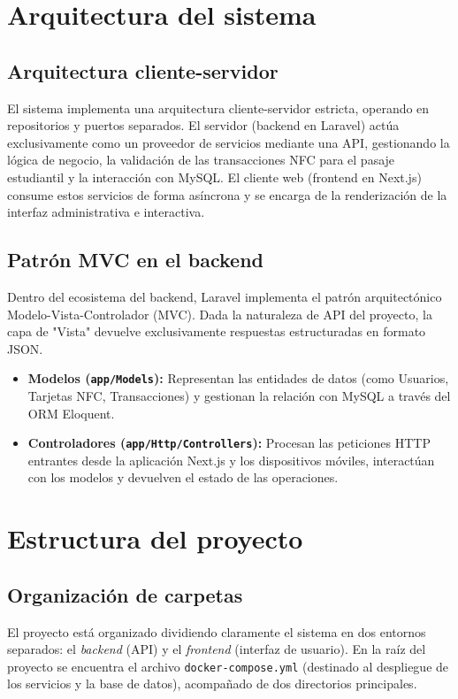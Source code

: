 \documentclass[12pt,letterpaper]{report}
\begin{document}
	\section{Arquitectura del sistema} 
	
	\subsection{Arquitectura cliente-servidor} 
	El sistema implementa una arquitectura cliente-servidor estricta, operando en repositorios y puertos separados. El servidor (backend en Laravel) actúa exclusivamente como un proveedor de servicios mediante una API, gestionando la lógica de negocio, la validación de las transacciones NFC para el pasaje estudiantil y la interacción con MySQL. El cliente web (frontend en Next.js) consume estos servicios de forma asíncrona y se encarga de la renderización de la interfaz administrativa e interactiva.
	
	\subsection{Patrón MVC en el backend} 
	Dentro del ecosistema del backend, Laravel implementa el patrón arquitectónico Modelo-Vista-Controlador (MVC). Dada la naturaleza de API del proyecto, la capa de "Vista" devuelve exclusivamente respuestas estructuradas en formato JSON. 
	\begin{itemize}
		\item \textbf{Modelos (\texttt{app/Models}):} Representan las entidades de datos (como Usuarios, Tarjetas NFC, Transacciones) y gestionan la relación con MySQL a través del ORM Eloquent.
		\item \textbf{Controladores (\texttt{app/Http/Controllers}):} Procesan las peticiones HTTP entrantes desde la aplicación Next.js y los dispositivos móviles, interactúan con los modelos y devuelven el estado de las operaciones.
	\end{itemize}
	
	\section{Estructura del proyecto} 
	
	\subsection{Organización de carpetas} 
	El proyecto está organizado dividiendo claramente el sistema en dos entornos separados: el \textit{backend} (API) y el \textit{frontend} (interfaz de usuario). En la raíz del proyecto se encuentra el archivo \texttt{docker-compose.yml} (destinado al despliegue de los servicios y la base de datos), acompañado de dos directorios principales.
	
\end{document}
